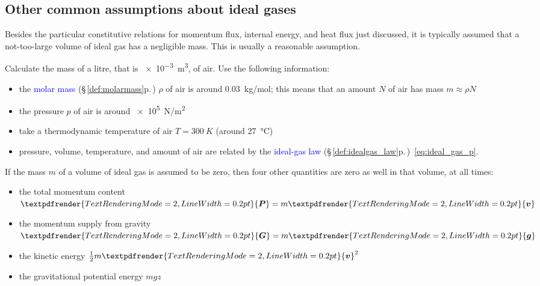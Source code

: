 \documentclass[a4paper,12pt,%
onecolumn,oneside,%
british%
]{memoir}
\renewcommand*{\bm}[1]{\textpdfrender{TextRenderingMode=2,LineWidth=0.2pt}{\boldsymbol{#1}}}
\renewcommand*{\|}[1][]{\nonscript\:#1\vert\nonscript\:\mathopen{}}
\newcommand*{\sect}{\S}%
\renewcommand*{\autoref}[3][\sect\,\ref]{\textcolor{blue}{#3} {\color{blue}\scriptsize(\faIcon[regular]{eye}\;#1{#2}\;p.\,\pageref{#2})}}
\newcommand*{\yg}{\bm{g}} %
\newcommand*{\yv}{\bm{v}}
\newcommand*{\yN}{N}
\newcommand*{\yrho}{\rho}
\newcommand*{\ym}{m}%
\newcommand*{\yP}{\bm{P}}
\newcommand*{\ypr}{p} %
\newcommand*{\yG}{\bm{G}}
\newcommand*{\yT}{T}%
\begin{document}
\subsection{Other common assumptions about ideal gases}
\label{sec:further_idealgas}

Besides the particular constitutive relations for momentum flux, internal energy, and heat flux just discussed, it is typically assumed that a not-too-large volume of ideal gas has a negligible mass. This is usually a reasonable assumption.
\begin{exercise}
  Calculate the mass of a litre, that is \qty{e-3}{m^3}, of air. Use the following information:
  \begin{itemize}[nosep]
  \item the \autoref{def:molarmass}{molar mass} $\yrho$ of air is around \qty{0.03}{kg/mol}; this means that an amount $\yN$ of air has mass $\ym\approx\yrho\yN$
  \item the pressure $\ypr$ of air is around \qty{e5}{N/m^2}
  \item take a thermodynamic temperature of air $\yT=\qty{300}{K}$ (around \qty{27}{\degreeCelsius})
  \item pressure, volume, temperature, and amount of air are related by the \autoref{def:idealgas_law}{ideal-gas law}~\eqref{eq:ideal_gas_p}.
  \end{itemize}
\end{exercise}%

If the mass $\ym$ of a volume of ideal gas is assumed to be zero, then four other quantities are zero as well in that volume, at all times:
\begin{itemize}[nosep]
\item the total momentum content $\yP=\ym\yv$
\item the momentum supply from gravity $\yG=\ym\yg$
\item the kinetic energy $\tfrac12\ym\yv^{2}$
\item the gravitational potential energy $\ym g z$
\end{itemize}
\end{document}
